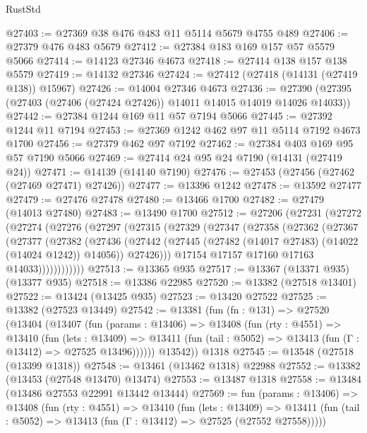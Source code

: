 \begin{lexlean}{RustStd}
\begin{coremodule}
@27403 := @27369 @38 @476 @483 @11 @5114 @5679 @4755 @489
@27406 := @27379 @476 @483 @5679
@27412 := @27384 @183 @169 @157 @57 @5579 @5066
@27414 := @14123 @27346 @4673
@27418 := @27414 @138 @157 @138 @5579
@27419 := @14132 @27346
@27424 := @27412 (@27418 (@14131 (@27419 @138)) @15967)
@27426 := @14004 @27346 @4673
@27436 := @27390 (@27395 (@27403 (@27406 (@27424 @27426)) @14011 @14015 @14019 @14026 @14033))
@27442 := @27384 @1244 @169 @11 @57 @7194 @5066
@27445 := @27392 @1244 @11 @7194
@27453 := @27369 @1242 @462 @97 @11 @5114 @7192 @4673 @1700
@27456 := @27379 @462 @97 @7192
@27462 := @27384 @403 @169 @95 @57 @7190 @5066
@27469 := @27414 @24 @95 @24 @7190 (@14131 (@27419 @24))
@27471 := @14139 (@14140 @7190)
@27476 := @27453 (@27456 (@27462 (@27469 @27471) @27426))
@27477 := @13396 @1242
@27478 := @13592 @27477
@27479 := @27476 @27478
@27480 := @13466 @1700
@27482 := @27479 (@14013 @27480)
@27483 := @13490 @1700
@27512 := @27206
    (@27231
      (@27272
        (@27274
          (@27276
            (@27297
              (@27315
                (@27329
                  (@27347
                    (@27358
                      (@27362
                        (@27367
                          (@27377
                            (@27382
                              (@27436
                                (@27442
                                  (@27445 (@27482 (@14017 @27483) (@14022 (@14024 @1242)) @14056))
                                  @27426)))
                            @17154
                            @17157
                            @17160
                            @17163
                            @14033))))))))))))
@27513 := @13365 @935
@27517 := @13367 (@13371 @935) (@13377 @935)
@27518 := @13386 @22985
@27520 := @13382 (@27518 @13401)
@27522 := @13424 (@13425 @935)
@27523 := @13420 @27522
@27525 := @13382 (@27523 @13449)
@27542 := @13381
    (fun (fn : @131) =>
    @27520
      (@13404
        (@13407
          (fun (params : @13406) =>
          @13408
            (fun (rty : @4551) =>
            @13410
              (fun (lets : @13409) =>
              @13411 (fun (tail : @5052) => @13413 (fun (Γ : @13412) => @27525 @13496))))))
        @13542))
    @1318
@27545 := @13548 (@27518 (@13399 @1318))
@27548 := @13461 (@13462 @1318) @22988
@27552 := @13382 (@13453 (@27548 @13470) @13474)
@27553 := @13487 @1318
@27558 := @13484 (@13486 @27553 @22991 @13442 @13444)
@27569 := fun (params : @13406) =>
  @13408
    (fun (rty : @4551) =>
    @13410
      (fun (lets : @13409) =>
      @13411 (fun (tail : @5052) => @13413 (fun (Γ : @13412) => @27525 (@27552 @27558)))))

\end{coremodule}
\end{lexlean}
